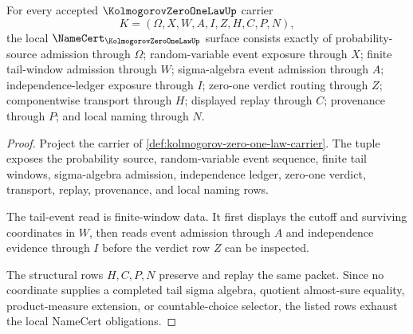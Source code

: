 \begin{theorem}
\label{thm:kolmogorov-zero-one-law-namecert-obligations}
For every accepted $\KolmogorovZeroOneLawUp$ carrier
$$
K=(\Omega,X,W,A,I,Z,H,C,P,N),
$$
the local $\NameCert_{\KolmogorovZeroOneLawUp}$ surface consists exactly of probability-source admission through $\Omega$; random-variable event exposure through $X$; finite tail-window admission through $W$; sigma-algebra event admission through $A$; independence-ledger exposure through $I$; zero-one verdict routing through $Z$; componentwise transport through $H$; displayed replay through $C$; provenance through $P$; and local naming through $N$.
\end{theorem}
\begin{proof}
Project the carrier of \autoref{def:kolmogorov-zero-one-law-carrier}. The tuple exposes the probability source, random-variable event sequence, finite tail windows, sigma-algebra admission, independence ledger, zero-one verdict, transport, replay, provenance, and local naming rows.

The tail-event read is finite-window data. It first displays the cutoff and surviving coordinates in $W$, then reads event admission through $A$ and independence evidence through $I$ before the verdict row $Z$ can be inspected.

The structural rows $H,C,P,N$ preserve and replay the same packet. Since no coordinate supplies a completed tail sigma algebra, quotient almost-sure equality, product-measure extension, or countable-choice selector, the listed rows exhaust the local NameCert obligations.
\end{proof}

